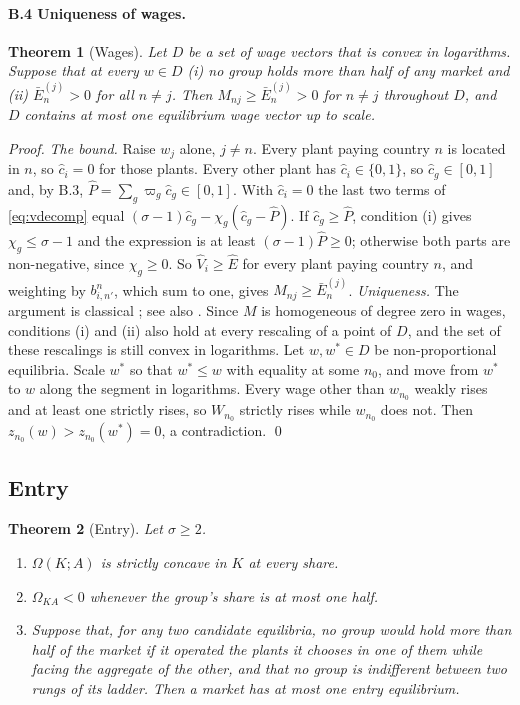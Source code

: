 \documentclass[11pt]{article}
\newtheorem{theorem}{Theorem}
\begin{document}
\paragraph{B.4 Uniqueness of wages.}\leavevmode
\begin{theorem}[Wages]\label{thm:wages}
Let $D$ be a set of wage vectors that is convex in logarithms. Suppose that at every
$w\in D$ (i) no group holds more than half of any market and (ii)
$\bar E^{(j)}_n>0$ for all $n\neq j$. Then $M_{nj}\ge\bar E^{(j)}_n>0$ for $n\neq j$
throughout $D$, and $D$ contains at most one equilibrium wage vector up to scale.
\end{theorem}
\noindent\emph{Proof.} \emph{The bound.} Raise $w_j$ alone,
$j\neq n$. Every plant paying country $n$ is located in $n$, so $\hat c_i=0$ for those
plants. Every other plant has $\hat c_i\in\{0,1\}$, so $\hat c_g\in[0,1]$ and, by B.3,
$\hat P=\sum_g\varpi_g\hat c_g\in[0,1]$. With
$\hat c_i=0$ the last two terms of \eqref{eq:vdecomp} equal
$(\sigma-1)\hat c_g-\chi_g(\hat c_g-\hat P)$. If $\hat c_g\ge\hat P$, condition (i)
gives $\chi_g\le\sigma-1$ and the expression is at least $(\sigma-1)\hat P\ge0$;
otherwise both parts are non-negative, since $\chi_g\ge0$. So $\hat V_i\ge\hat E$ for
every plant paying country $n$, and weighting by $b^n_{i,n'}$, which sum to one, gives
$M_{nj}\ge\bar E^{(j)}_n$. \emph{Uniqueness.} The argument is classical
\citep{ArrowBlockHurwicz1959}; see also \citet[Section 17.F]{MWG1995}. Since $M$ is
homogeneous of degree zero in wages, conditions (i) and (ii) also hold at every
rescaling of a point of $D$, and the set of these rescalings is still convex in
logarithms. Let $w,w^*\in D$ be non-proportional equilibria. Scale $w^*$ so that
$w^*\le w$ with equality at some $n_0$, and move from $w^*$ to $w$ along the segment in
logarithms. Every wage other than $w_{n_0}$ weakly rises and at least one strictly
rises, so $W_{n_0}$ strictly rises while $w_{n_0}$ does not. Then
$z_{n_0}(w)>z_{n_0}(w^*)=0$, a contradiction. \qed

\subsection{Entry}
\label{app:entry}

\begin{theorem}[Entry]\label{thm:entry}
Let $\sigma\ge2$.
\begin{enumerate}[label=(\alph*)]
\item $\Omega(K;A)$ is strictly concave in $K$ at every share.
\item $\Omega_{KA}<0$ whenever the group's share is at most one half.
\item Suppose that, for any two candidate equilibria, no group would hold more than
half of the market if it operated the plants it chooses in one of them while facing the
aggregate of the other, and that no group is indifferent between two rungs of its
ladder. Then a market has at most one entry equilibrium.
\end{enumerate}
\end{theorem}
\end{document}
